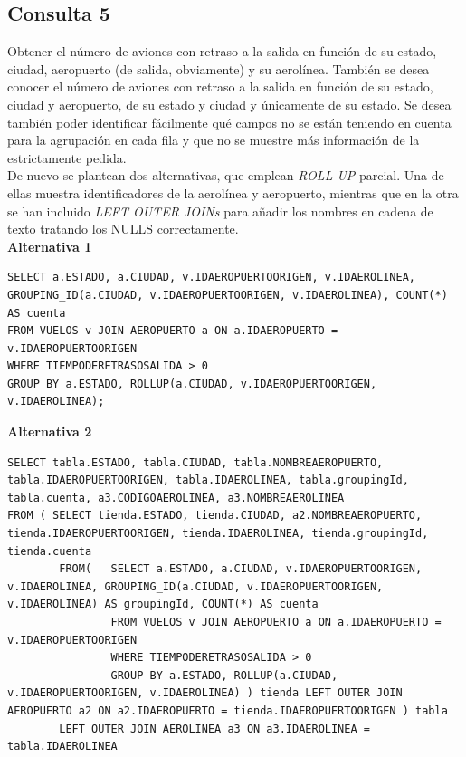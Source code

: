 \documentclass{article}
\begin{document}
\newpage
\subsection{Consulta 5}
Obtener el número de aviones con retraso a la salida en función de su estado, ciudad, aeropuerto (de salida, obviamente) y su aerolínea. También se desea conocer el número de aviones con retraso a la salida en función de su estado, ciudad y aeropuerto, de su estado y ciudad y únicamente de su estado. Se desea también poder identificar fácilmente qué campos no se están teniendo en cuenta para la agrupación en cada fila y que no se muestre más información de la estrictamente pedida.\\

De nuevo se plantean dos alternativas, que emplean \textit{ROLL UP} parcial. Una de ellas muestra identificadores de la aerolínea y aeropuerto, mientras que en la otra se han incluido \textit{LEFT OUTER JOINs} para añadir los nombres en cadena de texto tratando los NULLS correctamente.\\


\textbf{Alternativa 1}
\begin{lstlisting}
SELECT a.ESTADO, a.CIUDAD, v.IDAEROPUERTOORIGEN, v.IDAEROLINEA, GROUPING_ID(a.CIUDAD, v.IDAEROPUERTOORIGEN, v.IDAEROLINEA), COUNT(*) AS cuenta
FROM VUELOS v JOIN AEROPUERTO a ON a.IDAEROPUERTO = v.IDAEROPUERTOORIGEN 
WHERE TIEMPODERETRASOSALIDA > 0
GROUP BY a.ESTADO, ROLLUP(a.CIUDAD, v.IDAEROPUERTOORIGEN, v.IDAEROLINEA);
\end{lstlisting}

\textbf{Alternativa 2}
\begin{lstlisting}
SELECT tabla.ESTADO, tabla.CIUDAD, tabla.NOMBREAEROPUERTO, tabla.IDAEROPUERTOORIGEN, tabla.IDAEROLINEA, tabla.groupingId, tabla.cuenta, a3.CODIGOAEROLINEA, a3.NOMBREAEROLINEA 
FROM ( SELECT tienda.ESTADO, tienda.CIUDAD, a2.NOMBREAEROPUERTO, tienda.IDAEROPUERTOORIGEN, tienda.IDAEROLINEA, tienda.groupingId, tienda.cuenta
		FROM(   SELECT a.ESTADO, a.CIUDAD, v.IDAEROPUERTOORIGEN, v.IDAEROLINEA, GROUPING_ID(a.CIUDAD, v.IDAEROPUERTOORIGEN, v.IDAEROLINEA) AS groupingId, COUNT(*) AS cuenta
				FROM VUELOS v JOIN AEROPUERTO a ON a.IDAEROPUERTO = v.IDAEROPUERTOORIGEN 
				WHERE TIEMPODERETRASOSALIDA > 0
				GROUP BY a.ESTADO, ROLLUP(a.CIUDAD, v.IDAEROPUERTOORIGEN, v.IDAEROLINEA) ) tienda LEFT OUTER JOIN AEROPUERTO a2 ON a2.IDAEROPUERTO = tienda.IDAEROPUERTOORIGEN ) tabla
		LEFT OUTER JOIN AEROLINEA a3 ON a3.IDAEROLINEA = tabla.IDAEROLINEA
\end{lstlisting}
\end{document}
